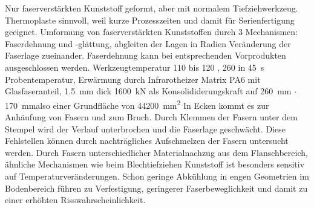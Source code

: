 Nur faserverstärkten Kunststoff geformt, aber mit normalem Tiefziehwerkzeug.
Thermoplaste sinnvoll, weil kurze Prozesszeiten und damit für Serienfertigung geeignet.
Umformung von faserverstärkten Kunststoffen durch 3 Mechanismen: Faserdehnung und -glättung, abgleiten der Lagen in Radien Veränderung der Faserlage zueinander.
Faserdehnung kann bei entsprechenden Vorprodukten ausgeschlossen werden.
Werkzeugtemperatur \SI{110}{\dC} bis \SI{120}{\dC} , \SI{260}{\dC} in \SI{45}{\second} Probentemperatur, Erwärmung durch Infrarotheizer
Matrix PA6 mit Glasfaseranteil, \SI{1.5}{\mm} dick
\SI{1600}{\kN} als Konsolididerungskraft auf \SI{260}{\mm} $\cdot$ \SI{170}{\mm}also einer Grundfläche von \SI{44200}{\mm\squared}
In Ecken kommt es zur Anhäufung von Fasern und zum Bruch.
Durch Klemmen der Fasern unter dem Stempel wird der Verlauf unterbrochen und die Faserlage geschwächt.
Diese Fehlstellen können durch nachträgliches Aufschmelzen der Fasern untersucht werden.
Durch Fasern unterschiedlicher Materialnachzug aus dem Flanschbereich, ähnliche Mechanismen wie beim Blechtiefziehen
Kunststoff ist besonders sensitiv auf Temperaturveränderungen.
Schon geringe Abkühlung in engen Geometrien im Bodenbereich führen zu Verfestigung, geringerer Faserbeweglichkeit und damit zu einer erhöhten Risswahrscheinlichkeit.\cite{Behrens2017}

